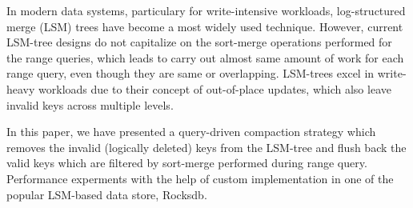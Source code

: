 In modern data systems, particulary for write-intensive workloads, log-structured merge (LSM) trees have become a most 
widely used technique. However, current LSM-tree designs do not capitalize on the sort-merge operations performed for 
the range queries, which leads to carry out almost same amount of work for each range query, even though they are same 
or overlapping. LSM-trees excel in write-heavy workloads due to their concept of out-of-place updates, which also leave 
invalid keys across multiple levels.

In this paper, we have presented a query-driven compaction strategy which removes the invalid (logically deleted)
keys from the LSM-tree and flush back the valid keys which are filtered by sort-merge performed during range query.
Performance experments with the help of custom implementation in one of the popular LSM-based data store, Rocksdb. 